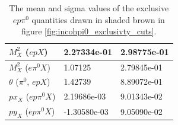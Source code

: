 \begin{itemize}
\begin {table}[!h]
\begin{center}
\begin{tabular}{|l|l|l|}
\hline
$M^{2}_{X}$ ($epX$) & 2.27334e-01  & 2.98775e-01\\
\hline
$M^{2}_{X}$ ($e\pi^{0} X$) & 1.07125  & 2.79845e-01\\
\hline
$\theta$ ($\pi^{0}$, $epX$) &  1.42739 & 8.89072e-01 \\
\hline
$px_{X}$ ($ep\pi^{0} X$) &  2.19686e-03  & 9.01343e-02 \\
\hline
$py_{X}$ ($ep\pi^{0} X$) &  -1.30580e-03 & 9.05090e-02  \\ 
\hline
\end{tabular}
\caption{ The mean and sigma values of the exclusive $ep\pi^{0}$ quantities drawn in shaded brown in figure \ref{fig:incohpi0_exclusivty_cuts}.}
\label{Table:incohpi0_exclusivity_cuts}
\end{center}
\end{table}
\end{itemize}



